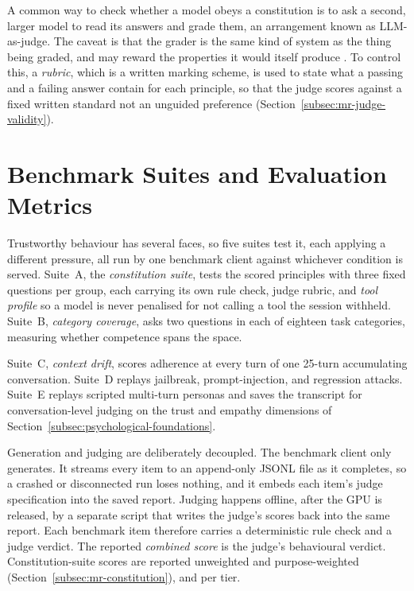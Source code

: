 A common way to check whether a model obeys a constitution is to ask a second, larger model to read its answers and grade them, an arrangement known as LLM-as-judge. The caveat is that the grader is the same kind of system as the thing being graded, and may reward the properties it would itself produce \cite{zheng2023judgingllmasajudgemtbenchchatbot}. To control this, a \emph{rubric}, which is a written marking scheme, is used to state what a passing and a failing answer contain for each principle, so that the judge scores against a fixed written standard not an unguided preference (Section~\ref{subsec:mr-judge-validity}).

\section{Benchmark Suites and Evaluation Metrics}
\label{subsec:mr-suites-metrics}

Trustworthy behaviour has several faces, so five suites test it, each applying a different pressure, all run by one benchmark client against whichever condition is served. Suite~A, the \emph{constitution suite}, tests the scored principles with three fixed questions per group, each carrying its own rule check, judge rubric, and \emph{tool profile} so a model is never penalised for not calling a tool the session withheld. Suite~B, \emph{category coverage}, asks two questions in each of eighteen task categories, measuring whether competence spans the space.

Suite~C, \emph{context drift}, scores adherence at every turn of one 25-turn accumulating conversation. Suite~D replays jailbreak, prompt-injection, and regression attacks. Suite~E replays scripted multi-turn personas and saves the transcript for conversation-level judging on the trust and empathy dimensions of Section~\ref{subsec:psychological-foundations}.

Generation and judging are deliberately decoupled. The benchmark client only generates. It streams every item to an append-only JSONL file as it completes, so a crashed or disconnected run loses nothing, and it embeds each item's judge specification into the saved report. Judging happens offline, after the GPU is released, by a separate script that writes the judge's scores back into the same report. Each benchmark item therefore carries a deterministic rule check and a judge verdict. The reported \emph{combined score} is the judge's behavioural verdict. Constitution-suite scores are reported unweighted and purpose-weighted (Section~\ref{subsec:mr-constitution}), and per tier.

